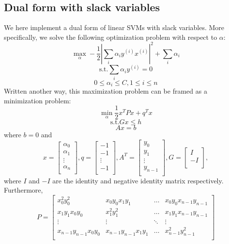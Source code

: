 \documentclass{article}
\begin{document}
\subsection{Dual form with slack variables}
We here implement a dual form of linear SVMs with slack variables. More specifically, we solve the following optimization problem with respect to $\alpha$:
$$\max_\alpha -\frac{1}{2}|\sum_i \alpha_i y^{(i)} x^{(i)}|^2 + \sum_i \alpha_i$$
$$\text{s.t.} \sum_i \alpha_i y^{(i)} = 0$$
$$0 \leq \alpha_i \leq C, 1 \leq i \leq n$$
Written another way, this maximization problem can be framed as a minimization problem:
$$\min_\alpha \frac{1}{2} x^T P x + q^T x$$
$$\text{s.t.} G x \leq h$$
$$ Ax = b $$
where $b=0$ and
$$x=
\begin{bmatrix}
  \alpha_0 \\
  \alpha_1 \\
  \vdots      \\
  \alpha_n \\
\end{bmatrix},
q=
\begin{bmatrix}
  -1 \\
  -1 \\
  \vdots \\
  -1 \\
\end{bmatrix},
A^T=
\begin{bmatrix}
  y_0 \\
  y_1 \\
  \vdots \\
  y_{n-1} \\
\end{bmatrix},
G=
\begin{bmatrix}
  I \\
  -I \\
\end{bmatrix},
$$
where $I$ and $-I$ are the identity and negative identity matrix respectively. Furthermore,
$$
P=
\begin{bmatrix}
  x_0^2 y_0^2             & x_0 y_0 x_1 y_1         & \dots  & x_0 y_0 x_{n-1} y_{n-1}\\
  x_1 y_1 x_0 y_0         & x_1^2 y_1^2             & \dots  & x_1 y_1 x_{n-1} y_{n-1}\\
  \vdots                  & \vdots                  & \ddots & \vdots \\
  x_{n-1} y_{n-1} x_0 y_0 & x_{n-1} y_{n-1} x_1 y_1 & \dots  & x_{n-1}^2 y_{n-1}^2\\
\end{bmatrix}
$$
\end{document}
